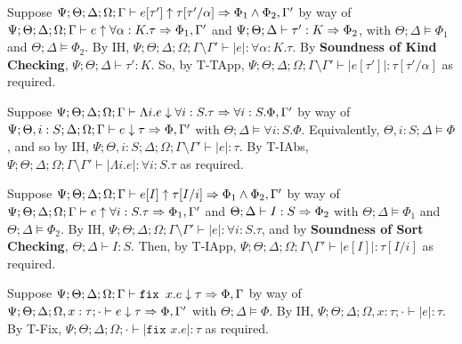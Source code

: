   \item[AT-TApp] Suppose $\Psi ; \Theta ; \Delta ; \Omega ; \Gamma \vdash e [\tau'] \uparrow \tau[\tau'/\alpha] \Rightarrow \Phi_1 \wedge \Phi_2, \Gamma'$ by way of $\Psi ; \Theta ; \Delta ; \Omega ; \Gamma \vdash e \uparrow \forall \alpha : K.\tau \Rightarrow \Phi_1, \Gamma'$ and $\Psi ; \Theta ; \Delta \vdash \tau' : K \Rightarrow \Phi_2$, with $\Theta ; \Delta \vDash \Phi_1$ and $\Theta ; \Delta \vDash \Phi_2$. By IH, $\Psi ; \Theta ; \Delta ; \Omega ; \Gamma \setminus \Gamma' \vdash |e| : \forall \alpha : K.\tau$. By \textbf{Soundness of Kind Checking}, $\Psi ; \Theta ; \Delta \vdash \tau' : K$. So, by T-TApp,  $\Psi ; \Theta ; \Delta ; \Omega ; \Gamma\setminus \Gamma' \vdash |e [\tau']| : \tau[\tau'/\alpha]$ as required.
  
  \item[AT-IAbs]
  Suppose $\Psi ; \Theta ; \Delta ; \Omega ; \Gamma \vdash \Lambda i. e \downarrow \forall i : S. \tau \Rightarrow \forall i : S. \Phi, \Gamma'$ by way of $\Psi ; \Theta, i : S ; \Delta ; \Omega ; \Gamma \vdash e \downarrow \tau \Rightarrow \Phi, \Gamma'$ with $\Theta ; \Delta \vDash \forall i : S. \Phi$. Equivalently, $\Theta , i : S; \Delta \vDash \Phi$, and so by IH, $\Psi ; \Theta, i : S ; \Delta ; \Omega ; \Gamma \setminus \Gamma' \vdash |e| : \tau$. By T-IAbs, $\Psi ; \Theta ; \Delta ; \Omega ; \Gamma\setminus \Gamma' \vdash |\Lambda i. e| : \forall i : S. \tau$ as required.
  
  \item[AT-IApp] Suppose $\Psi ; \Theta ; \Delta ; \Omega ; \Gamma \vdash e [I] \uparrow \tau[I/i] \Rightarrow \Phi_1 \wedge \Phi_2,\Gamma'$ by way of $\Psi ; \Theta ; \Delta ; \Omega ; \Gamma \vdash e \uparrow \forall i : S.\tau \Rightarrow \Phi_1,\Gamma'$ and $\Theta ; \Delta \vdash I : S \Rightarrow \Phi_2$ with $\Theta ; \Delta \vDash \Phi_1$ and $\Theta ; \Delta \vDash \Phi_2$. By IH, $\Psi ; \Theta ; \Delta ; \Omega ; \Gamma \setminus \Gamma' \vdash |e| : \forall i : S.\tau$, and by \textbf{Soundness of Sort Checking}, $\Theta ; \Delta \vdash I : S$. Then, by T-IApp, $\Psi ; \Theta ; \Delta ; \Omega ; \Gamma\setminus \Gamma' \vdash |e [I]| : \tau[I/i]$ as required.
  
  \item[AT-Fix] Suppose $\Psi ; \Theta ; \Delta ; \Omega ; \Gamma \vdash \texttt{fix } x.e \downarrow \tau \Rightarrow \Phi,\Gamma$ by way of $\Psi ; \Theta ; \Delta ; \Omega, x : \tau ; \cdot \vdash e \downarrow \tau \Rightarrow \Phi,\Gamma'$ with $\Theta ; \Delta \vDash \Phi$. By IH, $\Psi ; \Theta ; \Delta ; \Omega, x : \tau ; \cdot \vdash |e| : \tau$. By T-Fix, $\Psi ; \Theta ; \Delta ; \Omega ; \cdot \vdash |\texttt{fix } x.e| : \tau$ as required.
  
